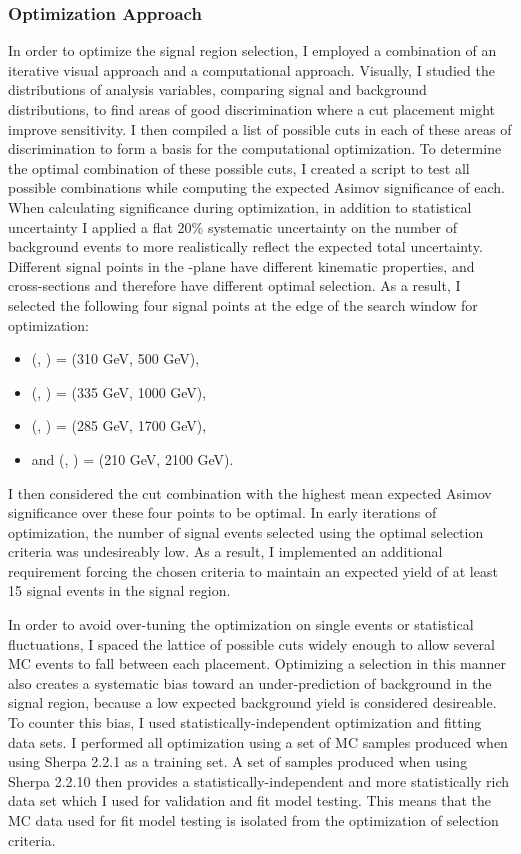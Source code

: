 \subsubsection{Optimization Approach}
In order to optimize the signal region selection, I employed a combination of an iterative visual approach and a computational approach. Visually, I studied the distributions of analysis variables, comparing signal and background distributions, to find areas of good discrimination where a cut placement might improve sensitivity. I then compiled a list of possible cuts in each of these areas of discrimination to form a basis for the computational optimization. To determine the optimal combination of these possible cuts, I created a script to test all possible combinations while computing the expected Asimov significance of each. When calculating significance during optimization, in addition to statistical uncertainty I applied a flat 20\% systematic uncertainty on the number of background events to more realistically reflect the expected total uncertainty. Different signal points in the \ms-\mZp plane have different kinematic properties, and cross-sections and therefore have different optimal selection. As a result, I selected the following four signal points at the edge of the search window for optimization:

\begin{itemize}
  \item (\ms, \mZp) = (310 GeV, 500 GeV),
  \item (\ms, \mZp) = (335 GeV, 1000 GeV),
  \item (\ms, \mZp) = (285 GeV, 1700 GeV),
  \item and (\ms, \mZp) = (210 GeV, 2100 GeV).
\end{itemize}

I then considered the cut combination with the highest mean expected Asimov significance over these four points to be optimal. In early iterations of optimization, the number of signal events selected using the optimal selection criteria was undesireably low. As a result, I implemented an additional requirement forcing the chosen criteria to maintain an expected yield of at least 15 signal events in the \merged signal region.

In order to avoid over-tuning the optimization on single events or statistical fluctuations, I spaced the lattice of possible cuts widely enough to allow several MC events to fall between each placement. Optimizing a selection in this manner also creates a systematic bias toward an under-prediction of background in the signal region, because a low expected background yield is considered desireable. To counter this bias, I used statistically-independent optimization and fitting data sets. I performed all optimization using a set of MC samples produced when using Sherpa 2.2.1 as a training set. A set of samples produced when using Sherpa 2.2.10 then provides a statistically-independent and more statistically rich data set which I used for validation and fit model testing. This means that the MC data used for fit model testing is isolated from the optimization of selection criteria.

